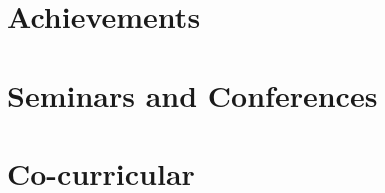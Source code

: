 \documentclass{prometheus_cv}
\begin{document}
\vspace*{-0.2 cm}
\section{\textcolor{goog}{Achievements}}




\vspace*{-0.2 cm}
\section{\textcolor{goog}{Seminars and Conferences}}




\vspace*{-0.6 cm}
\section{\textcolor{goog}{Co-curricular}}





\vspace*{-0.3 cm}
% 
\end{document}
